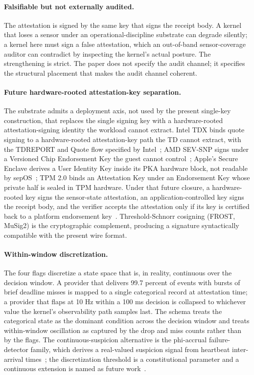 \paragraph{Falsifiable but not externally audited.}
The attestation is signed by the same key that signs the receipt body. A kernel that loses a sensor under an operational-discipline substrate can degrade silently; a kernel here must sign a false attestation, which an out-of-band sensor-coverage auditor can contradict by inspecting the kernel's actual posture. The strengthening is strict. The paper does not specify the audit channel; it specifies the structural placement that makes the audit channel coherent.

\paragraph{Future hardware-rooted attestation-key separation.}
The substrate admits a deployment axis, not used by the present single-key construction, that replaces the single signing key with a hardware-rooted attestation-signing identity the workload cannot extract. Intel TDX binds quote signing to a hardware-rooted attestation-key path the TD cannot extract, with the TDREPORT and Quote flow specified by Intel~\cite{intelTDXSpec2023}; AMD SEV-SNP signs under a Versioned Chip Endorsement Key the guest cannot control~\cite{amdSEVSNPSpec2025}; Apple's Secure Enclave derives a User Identity Key inside its PKA hardware block, not readable by sepOS~\cite{applePlatformSecurity2024}; TPM 2.0 binds an Attestation Key under an Endorsement Key whose private half is sealed in TPM hardware. Under that future closure, a hardware-rooted key signs the sensor-state attestation, an application-controlled key signs the receipt body, and the verifier accepts the attestation only if its key is certified back to a platform endorsement key~\cite{rfc9334RATS}. Threshold-Schnorr cosigning (FROST, MuSig2) is the cryptographic complement, producing a signature syntactically compatible with the present wire format.

\paragraph{Within-window discretization.}
The four flags discretize a state space that is, in reality, continuous over the decision window. A provider that delivers 99.7 percent of events with bursts of brief deadline misses is mapped to a single categorical record at attestation time; a provider that flaps at 10 Hz within a 100 ms decision is collapsed to whichever value the kernel's observability path samples last. The schema treats the categorical state as the dominant condition across the decision window and treats within-window oscillation as captured by the drop and miss counts rather than by the flags. The continuous-suspicion alternative is the phi-accrual failure-detector family, which derives a real-valued suspicion signal from heartbeat inter-arrival times~\cite{hayashibaraPhiAccrual2004}; the discretization threshold is a constitutional parameter and a continuous extension is named as future work~\cite{cardenasICS2008}.


